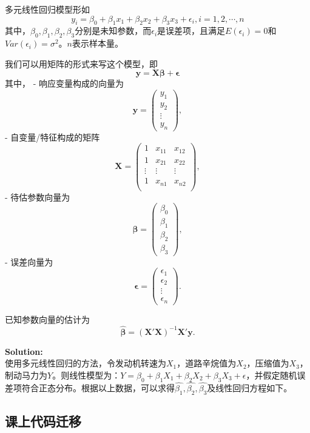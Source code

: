 \documentclass[11pt]{article}
\begin{document}
多元线性回归模型形如 \[
y_i = \beta_0 + \beta_1 x_{1} + \beta_2 x_{2} + \beta_3 x_{3} + \epsilon_{i}, i=1,2,\cdots,n
\]
其中，\(\beta_0,\beta_1,\beta_2,\beta_3\)分别是未知参数，而\(\epsilon_{i}\)是误差项，且满足\(E(\epsilon_{i}) = 0\)和\(Var(\epsilon_{i}) = \sigma^2\)。\(n\)表示样本量。

我们可以用矩阵的形式来写这个模型，即 \[
\mathbf{y} = \mathbf{X}\mathbf{\beta} + \mathbf{\epsilon}
\] 其中， - 响应变量构成的向量为\[
\mathbf{y} = \begin{pmatrix}y_1\\y_2\\\vdots\\ y_n\end{pmatrix},
\] - 自变量/特征构成的矩阵\[
\mathbf{X} = \begin{pmatrix}
1 & x_{11} & x_{12} \\
1 & x_{21} & x_{22} \\
\vdots & \vdots & \vdots \\
1 & x_{n1} & x_{n2} \\
\end{pmatrix},
\] - 待估参数向量为 \[
\mathbf{\beta} = \begin{pmatrix}
\beta_0 \\ \beta_1 \\ \beta_2 \\ \beta_3
\end{pmatrix},
\] - 误差向量为 \[
\mathbf{\epsilon} = \begin{pmatrix}\epsilon_1\\\epsilon_2\\\vdots\\ \epsilon_n\end{pmatrix}.
\]

    已知参数向量的估计为 \[
\hat{\mathbf{\beta}} = (\mathbf{X}'\mathbf{X})^{-1} \mathbf{X}'\mathbf{y}.
\]

    \textbf{Solution:}\\
使用多元线性回归的方法，令发动机转速为\(X_1\)，道路辛烷值为\(X_2\)，压缩值为\(X_3\)，制动马力为\(Y\)。则线性模型为：\(Y = \beta_0 + \beta_1X_1 + \beta_2X_2 + \beta_3X_3 +\epsilon\)，并假定随机误差项符合正态分布。根据以上数据，可以求得\(\hat{\beta_1},\hat{\beta_2},\hat{\beta_3}\)及线性回归方程如下。

    \hypertarget{ux8bfeux4e0aux4ee3ux7801ux8fc1ux79fb}{%
\subsection{课上代码迁移}\label{ux8bfeux4e0aux4ee3ux7801ux8fc1ux79fb}}
\end{document}
